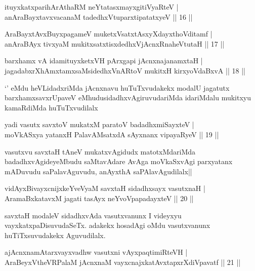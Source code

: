 
\begin{shl}
ituyxkatxparihArAthaRM neYtatasxmayxgitiVyaRteV |\\
anAraBayxtavxvacanaM tadedhxVtuparxtipatatxyeV \hfill || 16 ||
\end{shl}
\begin{shl}
AraBayxtAvxBuyxpagameV muketxVsatxtAsxyXdayxthoVditamf |\\
anAraBAyx tivxyaM mukitxsatxtisxdedhxVjAcnxRnaheVtutaH \hfill || 17 ||
\end{shl}
\begin{shl}
barxhamx vA idamituyxketxVH pArxgapi jAcnxnajanamxtaH |\\
jagadabxrXhAmxtamxsaMsidedhxVnARtoV mukitxH kirxyoVdaBxvA \hfill || 18 ||
\end{shl}

\begin{artha}
`\stext' eMdu heVLidadxriMda jAcnxnavu huTuTxvudakekx modalU jagatutx barxhamxsavxrUpaveV eMhudusidadhxvAgiruvudariMda idariMdalu mukitxyu kamaRdiMda huTuTxvudilalx
\end{artha}

\begin{shl}
yadi vasutx savxtoV mukatxM paratoV badadhxmiSayxteV |\\
moVkASxya yatanxH PalavAMsatxdA sAyxnanx vipayaRyeV \hfill || 19 ||
\end{shl}

\begin{artha}
vasutxvu savxtaH tAneV mukatxvAgidudx matotxMdariMda badadhxvAgideyeMbudu saMtavAdare AvAga moVkaSxvAgi parxyatanx mADuvudu saPalavAguvudu, anAyxthA saPAlavAgudilalx||
\end{artha}


\begin{shl}
vidAyx\s BivayxcnijxkeYveVyaM savxtaH sidadhxsayx vasutxnaH |\\
AramaBxkatavxM jagati tasAyx neYvoVpapadayxteV \hfill || 20 ||
\end{shl}

\begin{artha}
savxtaH modaleV sidadhxvAda vasutxvanunx I videyxyu vayxkatxpaDisuvudaSeTx. adakekx hosadAgi oMdu vasutxvanunx huTiTxsuvudakekx Aguvudilalx.
\end{artha}

\begin{shl}
ajAcnxnamAtarxvayxvadhw vasutxni vAyxpaqtimiRteVH |\\
AraBeyxV\s theVR\s PalaM jAcnxnaM vayxcnajxkatAvxtapxrXdiVpavatf \hfill || 21 ||
\end{shl}

